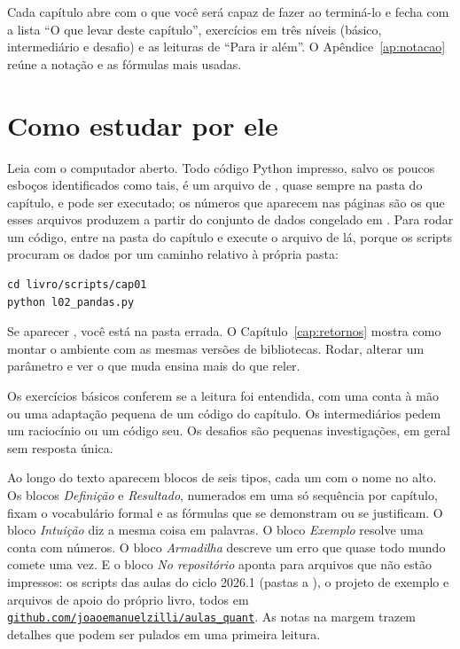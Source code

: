 Cada capítulo abre com o que você será capaz de fazer ao terminá-lo e fecha com a lista ``O que levar deste capítulo'', exercícios em três níveis (básico, intermediário e desafio) e as leituras de ``Para ir além''. O Apêndice~\ref{ap:notacao} reúne a notação e as fórmulas mais usadas.

\section*{Como estudar por ele}

Leia com o computador aberto. Todo código Python impresso, salvo os poucos esboços identificados como tais, é um arquivo de , quase sempre na pasta do capítulo, e pode ser executado; os números que aparecem nas páginas são os que esses arquivos produzem a partir do conjunto de dados congelado em . Para rodar um código, entre na pasta do capítulo e execute o arquivo de lá, porque os scripts procuram os dados por um caminho relativo à própria pasta:

\begin{lstlisting}[style=terminal]
cd livro/scripts/cap01
python l02_pandas.py
\end{lstlisting}

Se aparecer , você está na pasta errada. O Capítulo~\ref{cap:retornos} mostra como montar o ambiente com as mesmas versões de bibliotecas. Rodar, alterar um parâmetro e ver o que muda ensina mais do que reler.

Os exercícios básicos conferem se a leitura foi entendida, com uma conta à mão ou uma adaptação pequena de um código do capítulo. Os intermediários pedem um raciocínio ou um código seu. Os desafios são pequenas investigações, em geral sem resposta única.

Ao longo do texto aparecem blocos de seis tipos, cada um com o nome no alto. Os blocos \emph{Definição} e \emph{Resultado}, numerados em uma só sequência por capítulo, fixam o vocabulário formal e as fórmulas que se demonstram ou se justificam. O bloco \emph{Intuição} diz a mesma coisa em palavras. O bloco \emph{Exemplo} resolve uma conta com números. O bloco \emph{Armadilha} descreve um erro que quase todo mundo comete uma vez. E o bloco \emph{No repositório} aponta para arquivos que não estão impressos: os scripts das aulas do ciclo 2026.1 (pastas  a ), o projeto de exemplo  e arquivos de apoio do próprio livro, todos em \href{https://github.com/joaoemanuelzilli/aulas_quant}{\nolinkurl{github.com/joaoemanuelzilli/aulas_quant}}. As notas na margem trazem detalhes que podem ser pulados em uma primeira leitura.

